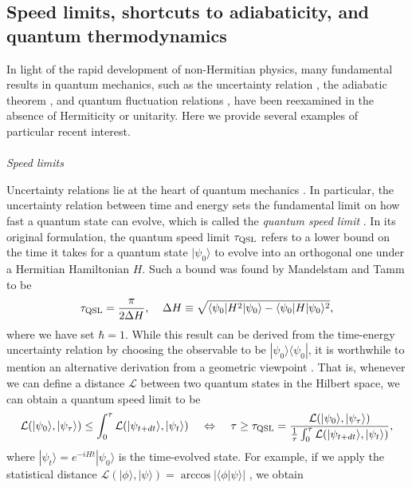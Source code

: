 \documentclass{tADP2e}
\theoremstyle{plain}
\theoremstyle{plain}
\theoremstyle{definition}
\begin{document}
\subsection{Speed limits, shortcuts to adiabaticity, 
and quantum thermodynamics\label{sec:6sl}}
In light of the rapid development of non-Hermitian physics, 
many fundamental results in quantum mechanics, such as the uncertainty relation \cite{WH49}, the adiabatic theorem \cite{BM28}, and quantum fluctuation relations \cite{CM11}, have been reexamined in the absence of Hermiticity or unitarity. Here we provide several examples of particular recent interest.
\\ \\ {\it Speed limits}

\vspace{3pt}
\noindent
Uncertainty relations lie at the heart of quantum mechanics \cite{WH49}. In particular, the uncertainty relation between time and energy \cite{AY61} sets the fundamental limit on how fast a quantum state can evolve, which is called the \emph{quantum speed limit} \cite{SD17}. In its original formulation, the quantum speed limit $\tau_{\rm QSL}$ refers to a lower bound on the time it takes for a quantum state $|\psi_0\rangle$ to evolve into an orthogonal one under a Hermitian Hamiltonian $H$. Such a bound was found by Mandelstam and Tamm to be \cite{LM45}
\begin{equation}
\tau_{\rm QSL}=\frac{\pi}{2\Delta H},\;\;\;\;\Delta H\equiv\sqrt{\langle\psi_0| H^2|\psi_0\rangle-\langle\psi_0|H|\psi_0\rangle^2},
\label{MTbound}
\end{equation}
where we have set $\hbar=1$. While this result can be derived from the time-energy uncertainty relation by choosing the observable to be $|\psi_0\rangle\langle\psi_0|$, it is worthwhile to mention an alternative derivation from a geometric viewpoint \cite{AJ90}. That is, whenever we can define a distance $\mathcal{L}$ between two quantum states in the Hilbert space, we can obtain a quantum speed limit to be
\begin{equation}
\mathcal{L}(|\psi_0\rangle,|\psi_\tau\rangle)\le \int^\tau_0 \mathcal{L}(|\psi_{t+dt}\rangle,|\psi_t\rangle)\;\;\;\;\Leftrightarrow\;\;\;\;\tau\ge\tau_{\rm QSL}= \frac{\mathcal{L}(|\psi_0\rangle,|\psi_\tau\rangle)}{\frac{1}{\tau}\int^\tau_0 \mathcal{L}(|\psi_{t+dt}\rangle,|\psi_t\rangle)},
\label{Ltau}
\end{equation}
where $|\psi_t\rangle=e^{-iHt}|\psi_0\rangle$ is the time-evolved state. For example, if we apply the statistical distance $\mathcal{L}(|\phi\rangle,|\psi\rangle)=\arccos |\langle\phi|\psi\rangle|$ \cite{WWK81}, we obtain 
\end{document}
